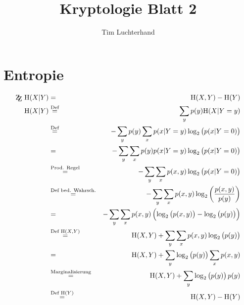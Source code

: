 \documentclass[DIN, pagenumber=false, fontsize=11pt, parskip=half]{scrartcl}
\title{Kryptologie Blatt 2}
\author{Tim Luchterhand}
\newcommand{\ZZ}{\mathrm{Z\kern-.3em\raise-0.5ex\hbox{Z}}}
\newcommand{\Ent}{\text{H}}
\begin{document}
    \maketitle
    \setcounter{section}{1}
    \section{Entropie}
    \begin{eqnarray}
        \ZZ \ \Ent(X | Y) &=& \Ent(X, Y) - \Ent(Y) \\
        \Ent(X | Y) &\stackrel{\text{Def}}{=}& \sum_y{p(y) \Ent(X | Y = y)} \\
        &\stackrel{\text{Def}}{=}& - \sum_y{p(y) \sum_x{p(x | Y = y) \log_2\left(p(x | Y = 0)\right)}} \\
        &=& - \sum_y{\sum_x{p(y) p(x | Y = y) \log_2\left(p(x | Y = 0)\right)}} \\
        &\stackrel{\text{Prod. Regel}}{=}& - \sum_y{\sum_x{p(x, y) \log_2\left(p(x | Y = 0)\right)}} \\
        &\stackrel{\text{Def bed. Wahrsch.}}{=}& - \sum_y{\sum_x{p(x, y) \log_2\left(\frac{p(x,y)}{p(y)}\right)}} \\
        &=& - \sum_y{\sum_x{p(x, y) \left(\log_2\left(p(x, y)\right) - \log_2\left(p(y)\right)\right)}} \\
        &\stackrel{\text{Def } \Ent(X, Y)}{=}& \Ent(X, Y) + \sum_y{\sum_x{p(x, y) \log_2\left(p(y)\right)}} \\
        &=& \Ent(X, Y) + \sum_y{\log_2\left(p(y)\right) \sum_x{p(x, y) }} \\
        &\stackrel{\text{Marginalisierung}}{=}& \Ent(X, Y) + \sum_y{\log_2\left(p(y)\right) p(y)} \\
        &\stackrel{\text{Def } \Ent(Y)}{=}& \Ent(X, Y) - \Ent(Y)
    \end{eqnarray}
\end{document}
